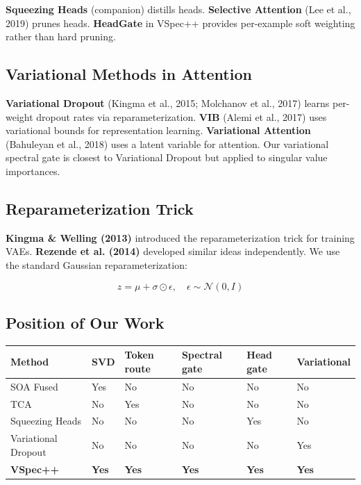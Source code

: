 \textbf{Squeezing Heads} (companion) distills heads. \textbf{Selective Attention} 
(Lee et al., 2019) prunes heads. \textbf{HeadGate} in VSpec++ provides per-example 
soft weighting rather than hard pruning.

\subsection{Variational Methods in Attention}

\textbf{Variational Dropout} (Kingma et al., 2015; Molchanov et al., 2017) 
learns per-weight dropout rates via reparameterization. \textbf{VIB} (Alemi 
et al., 2017) uses variational bounds for representation learning. 
\textbf{Variational Attention} (Bahuleyan et al., 2018) uses a latent variable 
for attention. Our variational spectral gate is closest to Variational 
Dropout but applied to singular value importances.

\subsection{Reparameterization Trick}

\textbf{Kingma \& Welling (2013)} introduced the reparameterization trick for 
training VAEs. \textbf{Rezende et al. (2014)} developed similar ideas 
independently. We use the standard Gaussian reparameterization:

\[
z = \mu + \sigma \odot \epsilon, \quad \epsilon \sim \mathcal{N}(0, I)
\tag{2.1}
\]

\subsection{Position of Our Work}

\begin{table}[H]
\centering
\small
\begin{tabular}{llllll}
\toprule
\textbf{Method} & \textbf{SVD} & \textbf{Token route} & \textbf{Spectral gate} & \textbf{Head gate} & \textbf{Variational} \\
\midrule
SOA Fused & Yes & No & No & No & No \\
TCA & No & Yes & No & No & No \\
Squeezing Heads & No & No & No & Yes & No \\
Variational Dropout & No & No & No & No & Yes \\
\textbf{VSpec++} & \textbf{Yes} & \textbf{Yes} & \textbf{Yes} & \textbf{Yes} & \textbf{Yes} \\
\bottomrule
\end{tabular}
\end{table}

